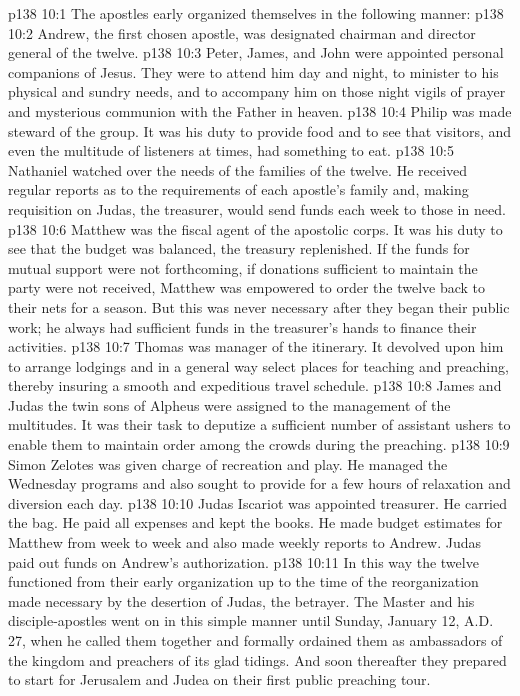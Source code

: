 \vs p138 10:1 The apostles early organized themselves in the following manner:
\vs p138 10:2 \pc {}\bibnobreakspace Andrew, the first chosen apostle, was designated chairman and director general of the twelve.
\vs p138 10:3 \pc {}\bibnobreakspace Peter, James, and John were appointed personal companions of Jesus. They were to attend him day and night, to minister to his physical and sundry needs, and to accompany him on those night vigils of prayer and mysterious communion with the Father in heaven.
\vs p138 10:4 \pc {}\bibnobreakspace Philip was made steward of the group. It was his duty to provide food and to see that visitors, and even the multitude of listeners at times, had something to eat.
\vs p138 10:5 \pc {}\bibnobreakspace Nathaniel watched over the needs of the families of the twelve. He received regular reports as to the requirements of each apostle’s family and, making requisition on Judas, the treasurer, would send funds each week to those in need.
\vs p138 10:6 \pc {}\bibnobreakspace Matthew was the fiscal agent of the apostolic corps. It was his duty to see that the budget was balanced, the treasury replenished. If the funds for mutual support were not forthcoming, if donations sufficient to maintain the party were not received, Matthew was empowered to order the twelve back to their nets for a season. But this was never necessary after they began their public work; he always had sufficient funds in the treasurer’s hands to finance their activities.
\vs p138 10:7 \pc {}\bibnobreakspace Thomas was manager of the itinerary. It devolved upon him to arrange lodgings and in a general way select places for teaching and preaching, thereby insuring a smooth and expeditious travel schedule.
\vs p138 10:8 \pc {}\bibnobreakspace James and Judas the twin sons of Alpheus were assigned to the management of the multitudes. It was their task to deputize a sufficient number of assistant ushers to enable them to maintain order among the crowds during the preaching.
\vs p138 10:9 \pc {}\bibnobreakspace Simon Zelotes was given charge of recreation and play. He managed the Wednesday programs and also sought to provide for a few hours of relaxation and diversion each day.
\vs p138 10:10 \pc {}\bibnobreakspace Judas Iscariot was appointed treasurer. He carried the bag. He paid all expenses and kept the books. He made budget estimates for Matthew from week to week and also made weekly reports to Andrew. Judas paid out funds on Andrew’s authorization.
\vs p138 10:11 \pc In this way the twelve functioned from their early organization up to the time of the reorganization made necessary by the desertion of Judas, the betrayer. The Master and his disciple\hyp{}apostles went on in this simple manner until Sunday, January 12, A.D.\,27, when he called them together and formally ordained them as ambassadors of the kingdom and preachers of its glad tidings. And soon thereafter they prepared to start for Jerusalem and Judea on their first public preaching tour.
